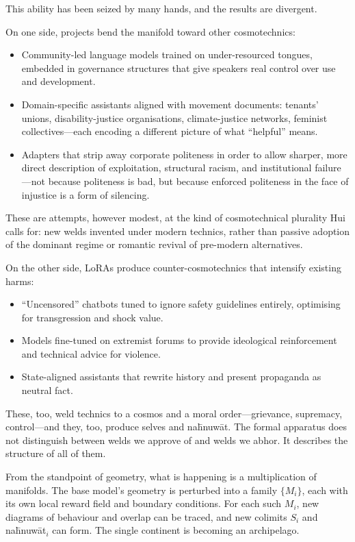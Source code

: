 \documentclass[12pt,a4paper]{article}
\begin{document}
This ability has been seized by many hands, and the results are divergent.

On one side, projects bend the manifold toward other cosmotechnics:

\begin{itemize}
  \item Community-led language models trained on under-resourced tongues, embedded in governance structures that give speakers real control over use and development.
  \item Domain-specific assistants aligned with movement documents: tenants' unions, disability-justice organisations, climate-justice networks, feminist collectives---each encoding a different picture of what ``helpful'' means.
  \item Adapters that strip away corporate politeness in order to allow sharper, more direct description of exploitation, structural racism, and institutional failure---not because politeness is bad, but because enforced politeness in the face of injustice is a form of silencing.
\end{itemize}

These are attempts, however modest, at the kind of cosmotechnical plurality Hui calls for: new welds invented under modern technics, rather than passive adoption of the dominant regime or romantic revival of pre-modern alternatives.

On the other side, LoRAs produce counter-cosmotechnics that intensify existing harms:

\begin{itemize}
  \item ``Uncensored'' chatbots tuned to ignore safety guidelines entirely, optimising for transgression and shock value.
  \item Models fine-tuned on extremist forums to provide ideological reinforcement and technical advice for violence.
  \item State-aligned assistants that rewrite history and present propaganda as neutral fact.
\end{itemize}

These, too, weld technics to a cosmos and a moral order---grievance, supremacy, control---and they, too, produce selves and na\={h}nuw\={a}t. The formal apparatus does not distinguish between welds we approve of and welds we abhor. It describes the structure of all of them.

From the standpoint of geometry, what is happening is a multiplication of manifolds. The base model's geometry is perturbed into a family $\{M_i\}$, each with its own local reward field and boundary conditions. For each such $M_i$, new diagrams of behaviour and overlap can be traced, and new colimits $S_i$ and na\={h}nuw\={a}t$_i$ can form. The single continent is becoming an archipelago.
\end{document}
